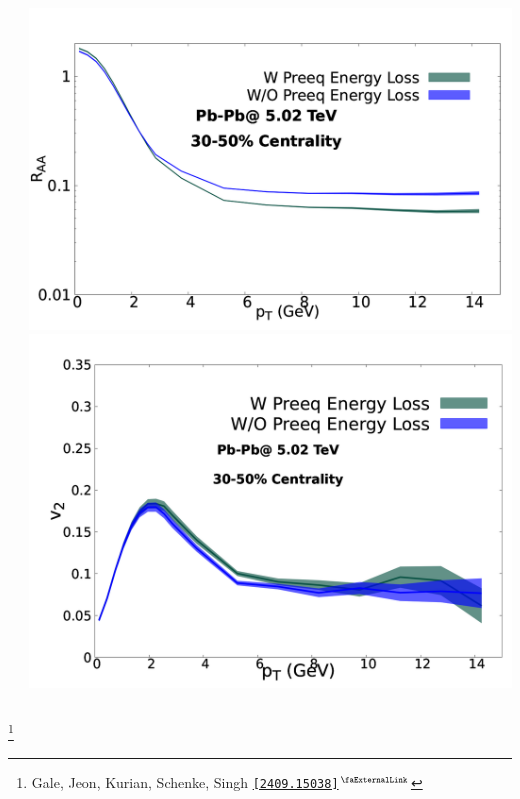 \documentclass[aspectratio=169,11pt,usenames,dvipsnames]{beamer}
\renewcommand{\thefootnote}{\color{customblue}\faPaperPlaneO}
\newcommand\blfootnote[1]{%
  \begingroup
  \renewcommand\thefootnote{}\footnote{#1}%
  \addtocounter{footnote}{-1}%
  \endgroup
}
\begin{document}
\begin{frame}
\begin{center}
\begin{columns}
\begin{center}
            \end{center}
                \begin{center}\includegraphics[width=\columnwidth]{images/RAA.png}\\
                    \includegraphics[width=\columnwidth]{images/v2.png}\end{center}
        \end{columns}
    \end{center}

    \vspace{-15pt}
    \blfootnote{\scriptsize Gale, Jeon, Kurian, Schenke, Singh \href{https://arxiv.org/abs/2409.15038}{{\color{blue}\texttt{[2409.15038]$^\text{\scalebox{0.9}{\faExternalLink}}$}}}}
\end{frame}
\end{document}
